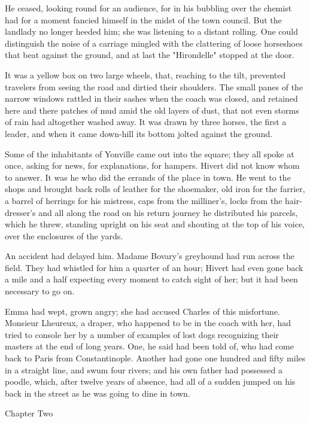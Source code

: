 \documentclass[11pt,twocolumn]{ltugboat}
\begin{document}
He ceased, looking round for an audience, for in his bubbling over
the chemist had for a moment fancied himself in the midst of the town
council. But the landlady no longer heeded him; she was listening to a
distant rolling. One could distinguish the noise of a carriage mingled
with the clattering of loose horseshoes that beat against the ground,
and at last the "Hirondelle" stopped at the door.

It was a yellow box on two large wheels, that, reaching to the tilt,
prevented travelers from seeing the road and dirtied their shoulders.
The small panes of the narrow windows rattled in their sashes when the
coach was closed, and retained here and there patches of mud amid the
old layers of dust, that not even storms of rain had altogether washed
away. It was drawn by three horses, the first a leader, and when it came
down-hill its bottom jolted against the ground.

Some of the inhabitants of Yonville came out into the square; they all
spoke at once, asking for news, for explanations, for hampers. Hivert
did not know whom to answer. It was he who did the errands of the place
in town. He went to the shops and brought back rolls of leather for
the shoemaker, old iron for the farrier, a barrel of herrings for his
mistress, caps from the milliner's, locks from the hair-dresser's and
all along the road on his return journey he distributed his parcels,
which he threw, standing upright on his seat and shouting at the top of
his voice, over the enclosures of the yards.

An accident had delayed him. Madame Bovary's greyhound had run across
the field. They had whistled for him a quarter of an hour; Hivert had
even gone back a mile and a half expecting every moment to catch sight
of her; but it had been necessary to go on.

Emma had wept, grown angry; she had accused Charles of this misfortune.
Monsieur Lheureux, a draper, who happened to be in the coach with
her, had tried to console her by a number of examples of lost dogs
recognizing their masters at the end of long years. One, he said had
been told of, who had come back to Paris from Constantinople. Another
had gone one hundred and fifty miles in a straight line, and swum four
rivers; and his own father had possessed a poodle, which, after twelve
years of absence, had all of a sudden jumped on his back in the street
as he was going to dine in town.



Chapter Two
\end{document}
